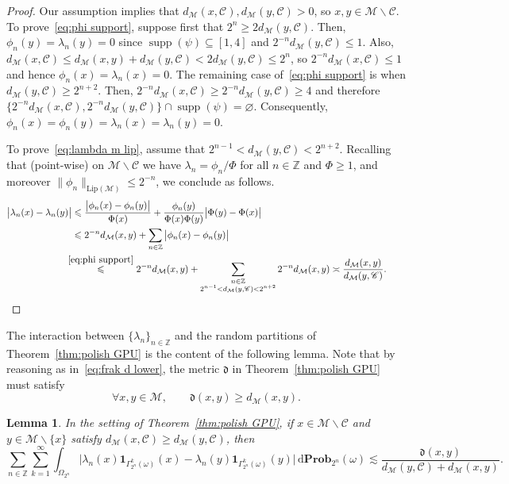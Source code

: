 \documentclass[11pt,reqno]{amsart}
\renewcommand{\le}{\leqslant}
\renewcommand{\ge}{\geqslant}
\renewcommand{\setminus}{\smallsetminus}
\newcommand{\ud}[0]{\,\mathrm{d}}
\newtheorem{lemma}[theorem]{Lemma}
\theoremstyle{remark}
\newcommand{\MM}{\mathcal{M}}
\renewcommand{\subset}{\subseteq}
\DeclareMathOperator{\supp}{supp}
\newcommand{\Z}{\mathbb Z}
\newcommand{\Lip}{\mathrm{Lip}}
\renewcommand{\Pr}{\mathbf{Prob}}
\renewcommand{\emptyset}{\varnothing}
\newcommand{\sub}{\mathscr{C}}
\renewcommand{\1}{\mathbf 1}
\begin{document}
\begin{proof} Our assumption implies that $d_{\MM}(x,\sub),d_{\MM}(y,\sub)>0$, so $x,y\in \MM\setminus \sub$. To prove~\eqref{eq:phi support}, suppose first that $2^n\ge 2d_{\MM}(y,\sub)$. Then, $\phi_n(y)=\lambda_n(y)=0$ since $\supp(\psi)\subset [1,4]$ and $2^{-n}d_{\MM}(y,\sub)\le 1$. Also, $d_{\MM}(x,\sub)\le d_{\MM}(x,y)+d_{\MM}(y,\sub)< 2d_{\MM}(y,\sub)\le 2^n$, so $2^{-n}d_{\MM}(x,\sub)\le 1$ and hence $\phi_n(x)=\lambda_n(x)=0$. The remaining case of~\eqref{eq:phi support} is when $d_{\MM}(y,\sub)\ge 2^{n+2}$. Then,  $2^{-n}d_\MM(x,\sub)\ge 2^{-n}d_\MM(y,\sub)\ge 4$ and therefore $\{2^{-n}d_\MM(x,\sub), 2^{-n}d_\MM(y,\sub)\}\cap \supp(\psi)=\emptyset$. Consequently, $\phi_n(x)=\phi_n(y)=\lambda_n(x)=\lambda_n(y)=0$.









To prove~\eqref{eq:lambda m lip}, assume that $2^{n-1}< d_{\MM}(y,\sub)< 2^{n+2}$. Recalling that (point-wise) on $\MM\setminus \sub$ we have $\lambda_n=\phi_n/\Phi$ for all $n\in \Z$ and $\Phi\ge 1$, and moreover $\|\phi_n\|_{\Lip(\MM)}\le 2^{-n}$, we conclude as follows.
\begin{align*}
\big|\lambda_n(x)-\lambda_n(y)\big|&\le \frac{\big|\phi_n(x)-\phi_n(y)\big|}{\Phi(x)}+\frac{\phi_n(y)}{\Phi(x)\Phi(y)}\big|\Phi(y)-\Phi(x)\big|
\\&\le 2^{-n}d_{\MM}(x,y)+\sum_{n\in \Z} \big|\phi_n(x)-\phi_n(y)\big|\\&\!\!\!\!\stackrel{\eqref{eq:phi support}}{\le}  2^{-n}d_{\MM}(x,y)+\sum_{\substack{n\in \Z\\ 2^{n-1}< d_{\MM}(y,\sub)< 2^{n+2}}} 2^{-n}d_{\MM}(x,y)\asymp \frac{d_{\MM}(x,y)}{d_{\MM}(y,\sub)}.\tag*{\qedhere}
\end{align*}
\end{proof}


The interaction between $\{\lambda_n\}_{n\in \Z}$ and the random partitions of Theorem~\ref{thm:polish GPU}  is the content of the following lemma. Note that by reasoning as in~\eqref{eq:frak d lower},   the metric $\mathfrak{d}$ in Theorem~\ref{thm:polish GPU} must satisfy
$$
\forall x,y\in \MM, \qquad \mathfrak{d}(x,y)\ge d_\MM(x,y).
$$



\begin{lemma}\label{lem:gentle} In the setting  of Theorem~\ref{thm:polish GPU}, if $x\in \MM\setminus \sub$ and  $y\in \MM\setminus\{x\}$ satisfy $d_{\MM}(x,\sub)\ge d_{\MM}(y,\sub)$, then
\begin{equation}\label{eq:ratio gentle}
\sum_{n\in \Z}\sum_{k=1}^\infty\int_{\Omega_{2^n}} \big|\lambda_n(x)\1_{\Gamma_{2^n}^k(\omega)}(x)-\lambda_n(y)\1_{\Gamma_{2^n}^k(\omega)}(y)\big|\ud\Pr_{2^n}(\omega)\lesssim \frac{ \mathfrak{d}(x,y)}{d_{\MM}(y,\sub)+d_{\MM}(x,y)}.
\end{equation}
\end{lemma}
\end{document}
